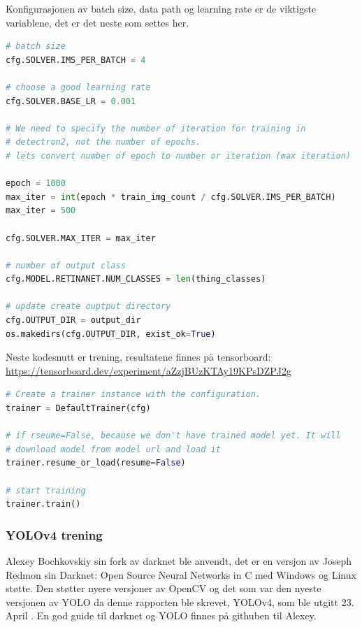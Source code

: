 Konfigurasjonen av batch size, data path og learning rate er de viktigste variablene, det er det neste som settes her. 

\begin{lstlisting}[language=Python, caption=Solver konfigurasjon i train.py]
# batch size
cfg.SOLVER.IMS_PER_BATCH = 4

# choose a good learning rate
cfg.SOLVER.BASE_LR = 0.001

# We need to specify the number of iteration for training in
# detectron2, not the number of epochs.
# lets convert number of epoch to number or iteration (max iteration)

epoch = 1000
max_iter = int(epoch * train_img_count / cfg.SOLVER.IMS_PER_BATCH)
max_iter = 500

cfg.SOLVER.MAX_ITER = max_iter

# number of output class
cfg.MODEL.RETINANET.NUM_CLASSES = len(thing_classes)

# update create ouptput directory
cfg.OUTPUT_DIR = output_dir
os.makedirs(cfg.OUTPUT_DIR, exist_ok=True)

\end{lstlisting}

Neste kodesnutt er trening, resultatene finnes på tensorboard: \\
\url{https://tensorboard.dev/experiment/aZzjBUzKTAy19KPsDZPJ2g}

\begin{lstlisting}[language=Python, caption=Treningskode i train.py]
# Create a trainer instance with the configuration.
trainer = DefaultTrainer(cfg) 

# if rseume=False, because we don't have trained model yet. It will
# download model from model url and load it
trainer.resume_or_load(resume=False)

# start training
trainer.train()

\end{lstlisting}


\subsubsection{YOLOv4 trening}

Alexey Bochkovskiy sin fork av darknet ble anvendt, det er en versjon av Joseph Redmon sin Darknet: Open Source Neural Networks in C med Windows og Linux støtte. Den støtter nyere versjoner av OpenCV og det som var den nyeste versjonen av YOLO da denne rapporten ble skrevet, YOLOv4, som ble utgitt 23. April \cite{Bochkovskiy m.fl. 2020}. En god guide til darknet og YOLO finnes på githuben til Alexey. \cite{Bochkovskiy 2020}

